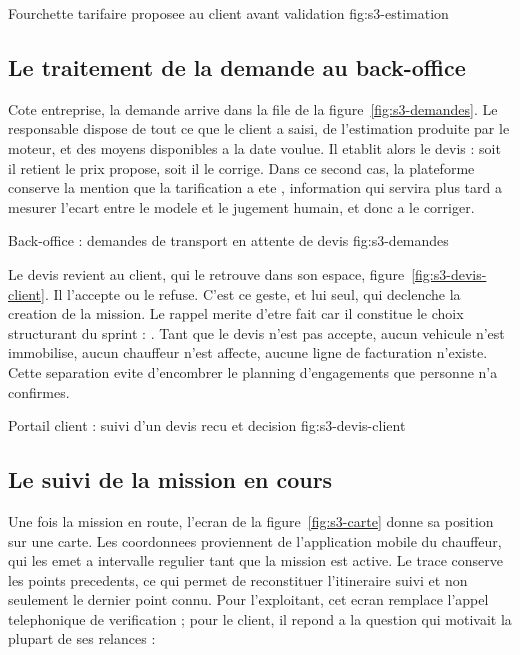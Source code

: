   {Fourchette tarifaire proposee au client avant validation}
  {fig:s3-estimation}

\subsection{Le traitement de la demande au back-office}

Cote entreprise, la demande arrive dans la file de la
figure~\ref{fig:s3-demandes}. Le responsable dispose de tout ce que le
client a saisi, de l'estimation produite par le moteur, et des moyens
disponibles a la date voulue. Il etablit alors le devis : soit il retient
le prix propose, soit il le corrige. Dans ce second cas, la plateforme
conserve la mention que la tarification a ete , information qui servira plus tard a mesurer l'ecart entre
le modele et le jugement humain, et donc a le corriger.

  {Back-office : demandes de transport en attente de devis}
  {fig:s3-demandes}

Le devis revient au client, qui le retrouve dans son espace,
figure~\ref{fig:s3-devis-client}. Il l'accepte ou le refuse. C'est ce
geste, et lui seul, qui declenche la creation de la mission. Le
rappel merite d'etre fait car il constitue le choix structurant du
sprint : . Tant que le
devis n'est pas accepte, aucun vehicule n'est immobilise, aucun chauffeur
n'est affecte, aucune ligne de facturation n'existe. Cette separation
evite d'encombrer le planning d'engagements que personne n'a confirmes.

  {Portail client : suivi d'un devis recu et decision}
  {fig:s3-devis-client}

\subsection{Le suivi de la mission en cours}

Une fois la mission en route, l'ecran de la figure~\ref{fig:s3-carte}
donne sa position sur une carte. Les coordonnees proviennent de
l'application mobile du chauffeur, qui les emet a intervalle regulier tant
que la mission est active. Le trace conserve les points precedents, ce qui
permet de reconstituer l'itineraire suivi et non seulement le dernier
point connu. Pour l'exploitant, cet ecran remplace l'appel telephonique de
verification ; pour le client, il repond a la question qui motivait la
plupart de ses relances : 

